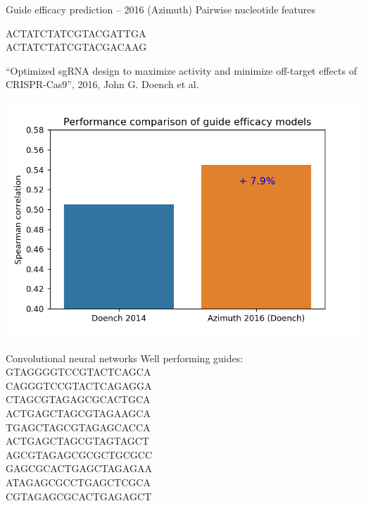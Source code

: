 \documentclass[Nike]{tuberlinbeamer}
\begin{document}
\begin{frame}{Guide efficacy prediction -- 2016 (Azimuth)}
  Pairwise nucleotide features

  \pause
  \huge ACTATCTATCGTACGA{\color{red}TT}GA \\
    \pause
  ACTATCTATCGTACGAC{\color{red}AA}G
    \begin{flushright}
      \tiny
      ``Optimized sgRNA design to maximize activity and minimize off-target effects of CRISPR-Cas9'', 2016, John G. Doench et al.\
    \end{flushright}
    \pause
  \center
  \includegraphics[width=0.5\linewidth]{./model_comparison1.png}
\end{frame}




\begin{frame}{Convolutional neural networks}
  Well performing guides: \\
  {\large
    GTAGGGGTCCGTACTCAGCA \\
    CAGGGTCCGTACTCAGAGGA \\
    CTAGCGTAGAGCGCACTGCA \\
    ACTGAGCTAGCGTAGAAGCA \\
    TGAGCTAGCGTAGAGCACCA \\
    ACTGAGCTAGCGTAGTAGCT \\
    AGCGTAGAGCGCGCTGCGCC \\
    GAGCGCACTGAGCTAGAGAA \\
    ATAGAGCGCCTGAGCTCGCA \\
    CGTAGAGCGCACTGAGAGCT \\
  }
\end{frame}
\end{document}
